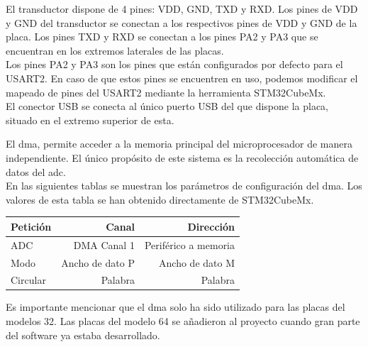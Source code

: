 \documentclass[spanish]{template/minim}
\newcommand{\dataelem}[1]{
    \noindent\textit{{\color{accent}{#1}}}
}
\begin{document}
El transductor dispone de 4 pines: VDD, GND, TXD y RXD. Los pines de VDD y GND del transductor se conectan a los respectivos pines de VDD y GND de la placa. Los pines TXD y RXD se conectan a los pines PA2 y PA3 que se encuentran en los extremos laterales de las placas.\\

Los pines PA2 y PA3 son los pines que están configurados por defecto para el USART2. En caso de que estos pines se encuentren en uso, podemos modificar el mapeado de pines del USART2 mediante la herramienta STM32CubeMx.\\

El conector USB se conecta al único puerto USB del que dispone la placa, situado en el extremo superior de esta.\\

\dataelem{DMA}

El \gls{dma}, permite acceder a la memoria principal del microprocesador de manera independiente. El único propósito de este sistema es la recolección automática de datos del \gls{adc}.\\

En las siguientes tablas se muestran los parámetros de configuración del \gls{dma}. Los valores de esta tabla se han obtenido directamente de STM32CubeMx.\\

\begin{table}[h]
    \centering

    \begin{tabularx}{\linewidth}{Xrr}
        \toprule
        Petición & Canal & Dirección \\
        \midrule
        ADC & DMA Canal 1 & Periférico a memoria \\
        \bottomrule
        Modo & Ancho de dato P & Ancho de dato M \\
        \midrule
        Circular & Palabra & Palabra \\
        \bottomrule
    \end{tabularx}

\end{table}

Es importante mencionar que el \gls{dma} solo ha sido utilizado para las placas del modelos 32. Las placas del modelo 64 se añadieron al proyecto cuando gran parte del software ya estaba desarrollado.\\
\end{document}
